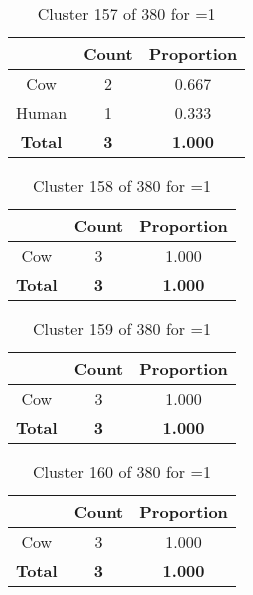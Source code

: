 \begin{table}[ht!]
\centering
\begin{tabular}{|c|c|c|}
\hline
\bf \Spec{} &\bf Count &\bf Proportion\\ \hline \hline
Cow & 2 & 0.667\\ \hline
Human & 1 & 0.333\\ \hline
\hline
\bf Total & \bf 3 & \bf 1.000\\ \hline
\end{tabular}
\label{tab:cluster:157:1}
\caption{Cluster 157 of 380 for \minneigh{}=1}
\end{table}

\begin{table}[ht!]
\centering
\begin{tabular}{|c|c|c|}
\hline
\bf \Spec{} &\bf Count &\bf Proportion\\ \hline \hline
Cow & 3 & 1.000\\ \hline
\hline
\bf Total & \bf 3 & \bf 1.000\\ \hline
\end{tabular}
\label{tab:cluster:158:1}
\caption{Cluster 158 of 380 for \minneigh{}=1}
\end{table}

\begin{table}[ht!]
\centering
\begin{tabular}{|c|c|c|}
\hline
\bf \Spec{} &\bf Count &\bf Proportion\\ \hline \hline
Cow & 3 & 1.000\\ \hline
\hline
\bf Total & \bf 3 & \bf 1.000\\ \hline
\end{tabular}
\label{tab:cluster:159:1}
\caption{Cluster 159 of 380 for \minneigh{}=1}
\end{table}

\clearpage
\begin{table}[ht!]
\centering
\begin{tabular}{|c|c|c|}
\hline
\bf \Spec{} &\bf Count &\bf Proportion\\ \hline \hline
Cow & 3 & 1.000\\ \hline
\hline
\bf Total & \bf 3 & \bf 1.000\\ \hline
\end{tabular}
\label{tab:cluster:160:1}
\caption{Cluster 160 of 380 for \minneigh{}=1}
\end{table}


